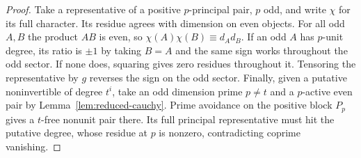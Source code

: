 \documentclass[11pt,a4paper]{article}
\numberwithin{equation}{section}
\theoremstyle{remark}
\begin{document}
\begin{proof}
Take a representative of a positive $p$-principal pair, $p$ odd, and write $\chi$ for its full character. Its residue agrees with dimension on even objects. For all odd $A,B$ the product $AB$ is even, so $\chi(A)\chi(B)\equiv d_A d_B$. If an odd $A$ has $p$-unit degree, its ratio is $\pm1$ by taking $B=A$ and the same sign works throughout the odd sector. If none does, squaring gives zero residues throughout it. Tensoring the representative by $g$ reverses the sign on the odd sector. Finally, given a putative noninvertible of degree $t^i$, take an odd dimension prime $p\ne t$ and a $p$-active even pair by Lemma~\ref{lem:reduced-cauchy}. Prime avoidance on the positive block $P_p$ gives a $t$-free nonunit pair there. Its full principal representative must hit the putative degree, whose residue at $p$ is nonzero, contradicting coprime vanishing.
\end{proof}
\end{document}

